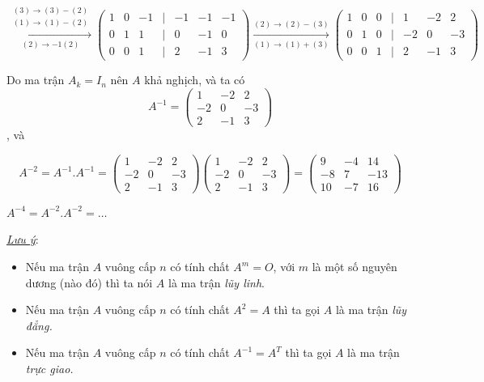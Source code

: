 \documentclass[
]{article}
\let\ul\uline
\begin{document}
$$\xrightarrow[(2)\rightarrow-1(2)]{\substack{(3)\rightarrow(3)-(2) \\ (1)\rightarrow(1)-(2)}} \begin{pmatrix} 1 & 0 & -1 & \mid & -1 & -1 & -1 \\ 0 & 1 & 1 & \mid & 0 & -1 & 0 \\ 0 & 0 & 1 & \mid & 2 & -1 & 3 \end{pmatrix} \xrightarrow[(1)\rightarrow(1)+(3)]{(2)\rightarrow(2)-(3)} \begin{pmatrix} 1 & 0 & 0 & \mid & 1 & -2 & 2 \\ 0 & 1 & 0 & \mid & -2 & 0 & -3 \\ 0 & 0 & 1 & \mid & 2 & -1 & 3 \end{pmatrix}$$

Do ma trận $A_k = I_n$ nên
$A$ khả nghịch, và
ta có $$A^{-1} = \begin{pmatrix} 1 & -2 & 2 \\ -2 & 0 & -3 \\ 2 & -1 & 3 \end{pmatrix}$$, và

$$A^{-2} = A^{-1} . A^{-1} = \begin{pmatrix} 1 & -2 & 2 \\ -2 & 0 & -3 \\ 2 & -1 & 3 \end{pmatrix} \begin{pmatrix} 1 & -2 & 2 \\ -2 & 0 & -3 \\ 2 & -1 & 3 \end{pmatrix} = \begin{pmatrix} 9 & -4 & 14 \\ -8 & 7 & -13 \\ 10 & -7 & 16 \end{pmatrix}$$

$A^{-4} = A^{-2} . A^{-2} = \dots$

\emph{\ul{Lưu ý}}:

\begin{itemize}
\item
  Nếu ma trận $A$
  vuông cấp $n$ có
  tính chất $A^m = O$,
  với $m$ là một số
  nguyên dương (nào đó) thì ta nói
  $A$ là ma trận
  \emph{lũy linh}.
\item
  Nếu ma trận $A$
  vuông cấp $n$ có
  tính chất $A^2 = A$ thì
  ta gọi $A$ là ma
  trận \emph{lũy đẳng.}
\item
  Nếu ma trận $A$
  vuông cấp $n$ có
  tính chất $A^{-1} = A^T$ thì
  ta gọi $A$ là ma
  trận \emph{trực giao.}
\end{itemize}
\end{document}
